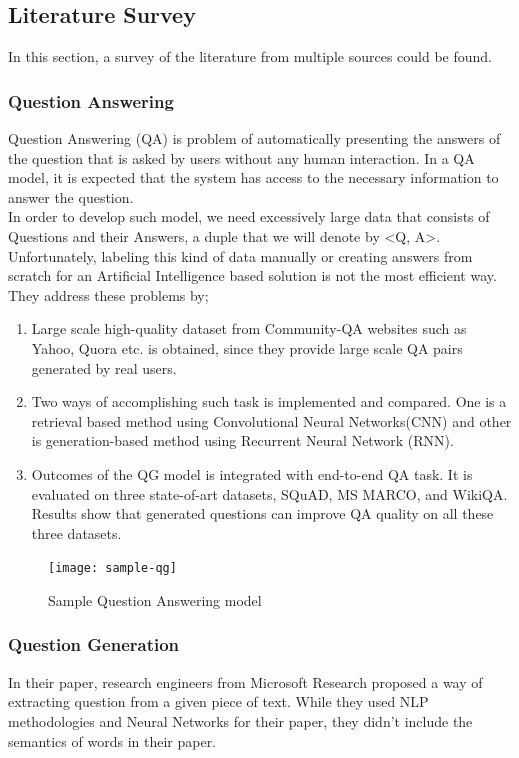 \documentclass{mefsdp}
\begin{document}
	\subsection{Literature Survey}
	In this section, a survey of the literature from multiple sources could be found.
	\subsubsection{Question Answering}
	Question Answering (QA) is problem of automatically presenting the answers of the question that is asked by users without any human interaction. In a QA model, it is expected that the system has access to the necessary information to answer the question.\\
	In order to develop such model, we need excessively large data that consists of Questions and their Answers, a duple that we will denote by <Q, A>. Unfortunately, labeling this kind of data manually or creating answers from scratch for an Artificial Intelligence based solution is not the most efficient way.
	They address these problems by;
	\begin{enumerate}
		\item Large scale high-quality dataset from Community-QA websites such as Yahoo, Quora etc. is obtained, since they provide large scale QA pairs generated by real users.
		\item Two ways of accomplishing such task is implemented and compared. One is a retrieval based method using Convolutional Neural Networks(CNN) and other is generation-based method using Recurrent Neural Network (RNN).
		\item Outcomes of the QG model is integrated with end-to-end QA task. It is evaluated on three state-of-art datasets, SQuAD, MS MARCO, and WikiQA. Results show that generated questions can improve QA quality on all these three datasets.
	\end{enumerate}
	
	\begin{figure}[ht!]
		\centering
		\texttt{[image: sample-qg]}
		\caption{Sample Question Answering model}
	\end{figure}

	\subsubsection{Question Generation}
	In their paper, research engineers from Microsoft Research proposed a way of extracting question from a given piece of text. \cite{duan2017question} While they used NLP methodologies and Neural Networks for their paper, they didn’t include the semantics of words in their paper.\\
	
\end{document}
